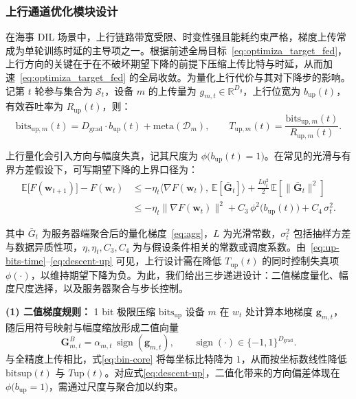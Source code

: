\subsubsection{上行通道优化模块设计}\label{sec:low_bit_up}
\label{sec:Upstream Channel Module Design}
在海事 DIL 场景中，上行链路带宽受限、时变性强且能耗约束严格，梯度上传常成为单轮训练时延的主导项之一。根据前述全局目标~\eqref{eq:optimiza_target_fed}，上行方向的关键在于在不破坏期望下降的前提下压缩上传比特与时延，从而加速~\eqref{eq:optimiza_target_fed} 的全局收敛。为量化上行代价与其对下降步的影响。记第 $t$ 轮参与集合为 $\mathcal S_t$，设备 $m$ 的上传量为 $g_{m,t}\in\mathbb R^{D_g}$，上行位宽为 $b_{\text{up}}(t)$，有效吞吐率为 $R_{\text{up}}(t)$，则：
\begin{equation}
	\label{eq:up-bits-time}
	\mathrm{bits}_{\text{up},m}(t)
	=
	D_{\text{grad}} \cdot b_{\text{up}}(t)
	+ \mathrm{meta}(\mathcal{D}_m),\qquad
	T_{\text{up},m}(t)
	=
	\frac{\mathrm{bits}_{\text{up},m}(t)}{R_{\text{up},m}(t)}.
\end{equation}

上行量化会引入方向与幅度失真，记其尺度为 $\phi\!\big(b_{\text{up}}(t)=1\big)$。在常见的光滑与有界方差假设下，可写期望下降的上界口径为：
\begin{equation}
	\label{eq:descent-up}
	\begin{aligned}
		\mathbb{E}\big[F(\mathbf{w}_{t+1})\big] - F(\mathbf{w}_t)
		&\le - \eta_t \big\langle \nabla F(\mathbf{w}_t),\, \mathbb{E}[\bar{\mathbf{G}}_t] \big\rangle
		+ \frac{L \eta_t^{2}}{2}\,\mathbb{E}\!\left[\|\bar{\mathbf{G}}_t\|^{2}\right] \\[0.5ex]
		&\le - \eta_t \big\|\nabla F(\mathbf{w}_t)\big\|^{2}
		+ C_{3}\,\phi^{2}\!\big(b_{\text{up}}(t)\big)
		+ C_{4}\,\sigma_{t}^{2}.
	\end{aligned}
\end{equation}


其中 $\bar G_t$ 为服务器端聚合后的量化梯度~\eqref{eq:agg}，$L$ 为光滑常数，$\sigma_t^2$ 包括抽样方差与数据异质性项，$\eta,\eta_t,C_3,C_4$ 为与假设条件相关的常数或调度系数。由~\eqref{eq:up-bits-time}–\eqref{eq:descent-up} 可见，上行设计需在降低 $T_{\text{up}}(t)$ 的同时控制失真项 $\phi(\cdot)$，以维持期望下降为负。为此，我们给出三步递进设计：二值梯度量化、幅度尺度选择，以及服务器聚合与步长控制。

\textbf{(1) 二值梯度规则：} 1 bit 极限压缩 $\mathrm{bits}_{\text{up}}$
设备 $m$ 在 $w_t$ 处计算本地梯度 $\mathbf{g}_{m,t}$，随后用符号映射与幅度缩放形成二值向量
\begin{equation}
	\label{eq:bin-core}
	\mathbf{G}_{m,t}^{B}=\alpha_{m,t}\,\operatorname{sign}(\mathbf{g}_{m,t}),\qquad \operatorname{sign}(\cdot)\in\{-1,1\}^{D_\text{grad}}.
\end{equation}
与全精度上传相比，式\eqref{eq:bin-core} 将每坐标比特降为 $1$，从而按坐标数线性降低 $\mathrm{bits}{\text{up}}(t)$ 与 $T\text{up}(t)$。对应式\eqref{eq:descent-up}，二值化带来的方向偏差体现在 $\phi\big(b_{\text{up}}=1\big)$，需通过尺度与聚合加以约束。


